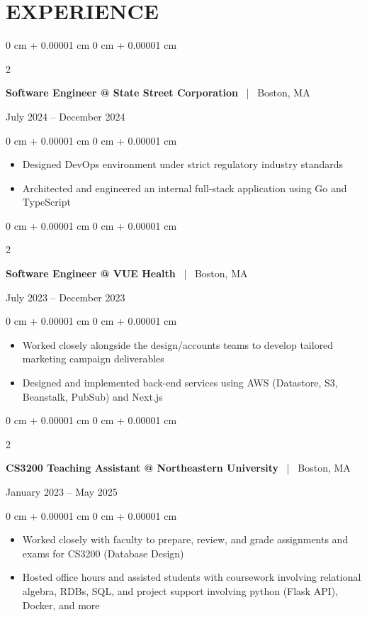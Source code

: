\documentclass[10pt, letterpaper]{article}
\newenvironment{highlights}{
    \begin{itemize}[
        topsep=0pt,
        parsep=0pt,
        partopsep=0pt,
        itemsep=0pt,
        leftmargin=0 cm + 10pt
    ]
}{
    \end{itemize}
} %
\newenvironment{onecolentry}{
    \begin{adjustwidth}{
        0 cm + 0.00001 cm
    }{
        0 cm + 0.00001 cm
    }
}{
    \end{adjustwidth}
} %
\newenvironment{twocolentry}[2][]{
    \onecolentry
    \def\secondColumn{#2}
    \setcolumnwidth{\fill, 4.5 cm}
    \begin{paracol}{2}
}{
    \switchcolumn \raggedleft \secondColumn
    \end{paracol}
    \endonecolentry
} %
\begin{document}

    \section{EXPERIENCE}

        
    \begin{twocolentry}{July 2024 -- December 2024}
        \textbf{Software Engineer @ State Street Corporation} ~|~ Boston, MA
	\end{twocolentry}
    \vspace{0.10 cm}
    \begin{onecolentry}
        \begin{highlights}
            \item Designed DevOps environment under strict regulatory industry standards
            \item Architected and engineered an internal full-stack application using Go and TypeScript
        \end{highlights}
    \end{onecolentry}

    \vspace{0.2 cm}

	\begin{twocolentry}{July 2023 -- December 2023}
        \textbf{Software Engineer @ VUE Health} ~|~ Boston, MA
	\end{twocolentry}
    \vspace{0.10 cm}
    \begin{onecolentry}
        \begin{highlights}
            \item Worked closely alongside the design/accounts teams to develop tailored marketing campaign deliverables
            \item Designed and implemented back-end services using AWS (Datastore, S3, Beanstalk, PubSub) and Next.js
        \end{highlights}
    \end{onecolentry}

	\vspace{0.2 cm}

	\begin{twocolentry}{January 2023 -- May 2025}
            \textbf{CS3200 Teaching Assistant @ Northeastern University} ~|~ Boston, MA
	\end{twocolentry}
    \vspace{0.10 cm}
    \begin{onecolentry}
        \begin{highlights}
            \item Worked closely with faculty to prepare, review, and grade assignments and exams for CS3200 (Database Design)
            \item Hosted office hours and assisted students with coursework involving relational algebra, RDBs, SQL, and project support involving python (Flask API), Docker, and more
        \end{highlights}
    \end{onecolentry}
\end{document}
